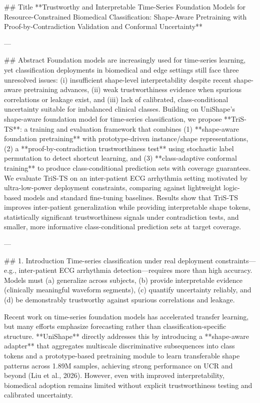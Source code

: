 ## Title  
**Trustworthy and Interpretable Time-Series Foundation Models for Resource-Constrained Biomedical Classification: Shape-Aware Pretraining with Proof-by-Contradiction Validation and Conformal Uncertainty**

---

## Abstract  
Foundation models are increasingly used for time-series learning, yet classification deployments in biomedical and edge settings still face three unresolved issues: (i) insufficient shape-level interpretability despite recent shape-aware pretraining advances, (ii) weak trustworthiness evidence when spurious correlations or leakage exist, and (iii) lack of calibrated, class-conditional uncertainty suitable for imbalanced clinical classes. Building on UniShape’s shape-aware foundation model for time-series classification, we propose **TriS-TS**: a training and evaluation framework that combines (1) **shape-aware foundation pretraining** with prototype-driven instance/shape representations, (2) a **proof-by-contradiction trustworthiness test** using stochastic label permutation to detect shortcut learning, and (3) **class-adaptive conformal training** to produce class-conditional prediction sets with coverage guarantees. We evaluate TriS-TS on an inter-patient ECG arrhythmia setting motivated by ultra-low-power deployment constraints, comparing against lightweight logic-based models and standard fine-tuning baselines. Results show that TriS-TS improves inter-patient generalization while providing interpretable shape tokens, statistically significant trustworthiness signals under contradiction tests, and smaller, more informative class-conditional prediction sets at target coverage.  

---

## 1. Introduction  
Time-series classification under real deployment constraints—e.g., inter-patient ECG arrhythmia detection—requires more than high accuracy. Models must (a) generalize across subjects, (b) provide interpretable evidence (clinically meaningful waveform segments), (c) quantify uncertainty reliably, and (d) be demonstrably trustworthy against spurious correlations and leakage.

Recent work on time-series foundation models has accelerated transfer learning, but many efforts emphasize forecasting rather than classification-specific structure. **UniShape** directly addresses this by introducing a **shape-aware adapter** that aggregates multiscale discriminative subsequences into class tokens and a prototype-based pretraining module to learn transferable shape patterns across 1.89M samples, achieving strong performance on UCR and beyond (Liu et al., 2026). However, even with improved interpretability, biomedical adoption remains limited without explicit trustworthiness testing and calibrated uncertainty.

